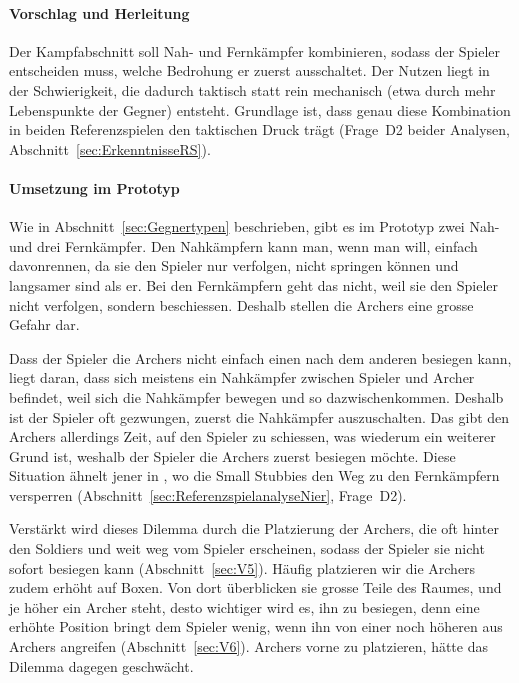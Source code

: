 \documentclass[../Main.tex]{subfiles}
\begin{document}
\paragraph{Vorschlag und Herleitung}
Der Kampfabschnitt soll Nah- und Fernkämpfer kombinieren, sodass der Spieler entscheiden muss, welche Bedrohung er zuerst ausschaltet. Der Nutzen liegt in der Schwierigkeit, die dadurch taktisch statt rein mechanisch (etwa durch mehr Lebenspunkte der Gegner) entsteht. Grundlage ist, dass genau diese Kombination in beiden Referenzspielen den taktischen Druck trägt (Frage~D2 beider Analysen, Abschnitt~\ref{sec:ErkenntnisseRS}).

\paragraph{Umsetzung im Prototyp}
Wie in Abschnitt~\ref{sec:Gegnertypen} beschrieben, gibt es im Prototyp zwei Nah- und drei Fernkämpfer. Den Nahkämpfern kann man, wenn man will, einfach davonrennen, da sie den Spieler nur verfolgen, nicht springen können und langsamer sind als er. Bei den Fernkämpfern geht das nicht, weil sie den Spieler nicht verfolgen, sondern beschiessen. Deshalb stellen die Archers eine grosse Gefahr dar.

Dass der Spieler die Archers nicht einfach einen nach dem anderen besiegen kann, liegt daran, dass sich meistens ein Nahkämpfer zwischen Spieler und Archer befindet, weil sich die Nahkämpfer bewegen und so dazwischenkommen. Deshalb ist der Spieler oft gezwungen, zuerst die Nahkämpfer auszuschalten. Das gibt den Archers allerdings Zeit, auf den Spieler zu schiessen, was wiederum ein weiterer Grund ist, weshalb der Spieler die Archers zuerst besiegen möchte. Diese Situation ähnelt jener in , wo die Small Stubbies den Weg zu den Fernkämpfern versperren (Abschnitt~\ref{sec:ReferenzspielanalyseNier}, Frage~D2).

Verstärkt wird dieses Dilemma durch die Platzierung der Archers, die oft hinter den Soldiers und weit weg vom Spieler erscheinen, sodass der Spieler sie nicht sofort besiegen kann (Abschnitt~\ref{sec:V5}). Häufig platzieren wir die Archers zudem erhöht auf Boxen. Von dort überblicken sie grosse Teile des Raumes, und je höher ein Archer steht, desto wichtiger wird es, ihn zu besiegen, denn eine erhöhte Position bringt dem Spieler wenig, wenn ihn von einer noch höheren aus Archers angreifen (Abschnitt~\ref{sec:V6}). Archers vorne zu platzieren, hätte das Dilemma dagegen geschwächt.
\end{document}
